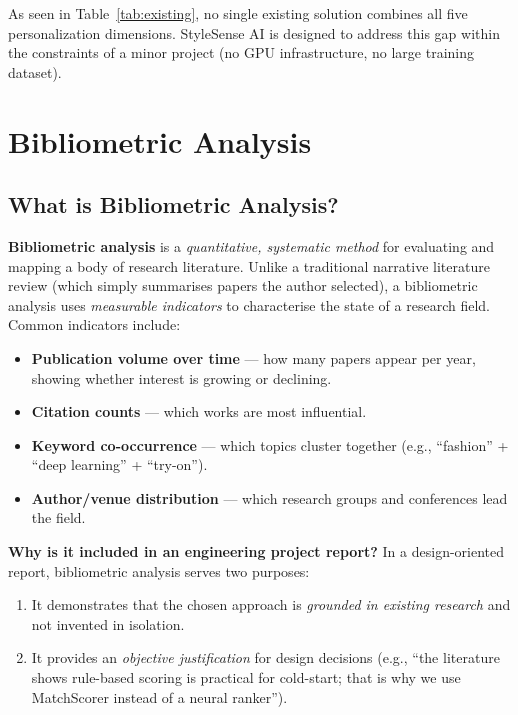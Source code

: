 \documentclass[12pt,a4paper]{report}
\newcommand{\ProjectShort}{StyleSense AI}
\begin{document}
As seen in Table~\ref{tab:existing}, no single existing solution combines all five personalization dimensions. \ProjectShort{} is designed to address this gap within the constraints of a minor project (no GPU infrastructure, no large training dataset).

\section{Bibliometric Analysis}

\subsection*{What is Bibliometric Analysis?}

\textbf{Bibliometric analysis} is a \textit{quantitative, systematic method} for evaluating and mapping a body of research literature. Unlike a traditional narrative literature review (which simply summarises papers the author selected), a bibliometric analysis uses \textit{measurable indicators} to characterise the state of a research field. Common indicators include:

\begin{itemize}
  \item \textbf{Publication volume over time} --- how many papers appear per year, showing whether interest is growing or declining.
  \item \textbf{Citation counts} --- which works are most influential.
  \item \textbf{Keyword co-occurrence} --- which topics cluster together (e.g., ``fashion'' + ``deep learning'' + ``try-on'').
  \item \textbf{Author/venue distribution} --- which research groups and conferences lead the field.
\end{itemize}

\textbf{Why is it included in an engineering project report?} In a design-oriented report, bibliometric analysis serves two purposes:
\begin{enumerate}
  \item It demonstrates that the chosen approach is \textit{grounded in existing research} and not invented in isolation.
  \item It provides an \textit{objective justification} for design decisions (e.g., ``the literature shows rule-based scoring is practical for cold-start; that is why we use MatchScorer instead of a neural ranker'').
\end{enumerate}
\end{document}
